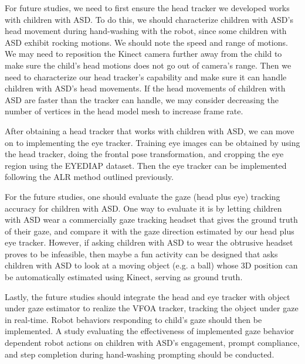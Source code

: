 For future studies, we need to first ensure the head tracker we developed works with children with ASD.  To do this, we should characterize children with ASD's head movement during hand-washing with the robot, since some children with ASD exhibit rocking motions.  We should note the speed and range of motions.  We may need to reposition the Kinect camera further away from the child to make sure the child's head motions does not go out of camera's range.  Then we need to characterize our head tracker's capability and make sure it can handle children with ASD's head movements.  If the head movements of children with ASD are faster than the tracker can handle, we may consider decreasing the number of vertices in the head model mesh to increase frame rate.

After obtaining a head tracker that works with children with ASD, we can move on to implementing the eye tracker.  Training eye images can be obtained by using the head tracker, doing the frontal pose transformation, and cropping the eye region using the EYEDIAP dataset.  Then the eye tracker can be implemented following the ALR method outlined previously.

For the future studies, one should evaluate the gaze (head plus eye) tracking accuracy for children with ASD.  One way to evaluate it is by letting children with ASD wear a commercially gaze tracking headset that gives the ground truth of their gaze, and compare it with the gaze direction estimated by our head plus eye tracker.  However, if asking children with ASD to wear the obtrusive headset proves to be infeasible, then maybe a fun activity can be designed that asks children with ASD to look at a moving object (e.g. a ball) whose 3D position can be automatically estimated using Kinect, serving as ground truth.

Lastly, the future studies should integrate the head and eye tracker with object under gaze estimator to realize the VFOA tracker, tracking the object under gaze in real-time.  Robot behaviors responding to child's gaze should then be implemented.  A study evaluating the effectiveness of implemented gaze behavior dependent robot actions on children with ASD's engagement, prompt compliance, and step completion during hand-washing prompting should be conducted.